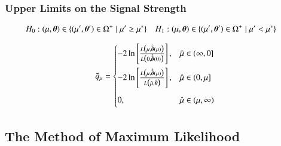 

\subsubsection{Upper Limits on the Signal Strength}


\begin{align*}
  &H_0: (\mu, \myvec{\theta}) \in \{ (\mu^\prime, \myvec{\theta}^\prime) \in \Omega^+ \mid \mu^\prime \geq \mu^* \}
  &&H_1: (\mu, \myvec{\theta}) \in \{ (\mu^\prime, \myvec{\theta}^\prime) \in \Omega^+ \mid \mu^\prime < \mu^* \}
\end{align*}





\begin{align*}
  \tilde{q}_\mu =
  \begin{cases}
    -2\ln\left[ \frac{ L\bigl( \mu, \hat{\hat{\myvec{\theta}}}(\mu) \bigr)}{L\bigl( 0, \hat{\hat{\myvec{\theta}}}(0) \bigr)} \right], & \muhat \in (\infty, 0] \\[1em]
    -2\ln\left[ \frac{ L\bigl( \mu, \hat{\hat{\myvec{\theta}}}(\mu) \bigr)}{L\bigl( \muhat, \hat{\myvec{\theta}} \bigr)} \right], & \muhat \in (0, \mu] \\[1em]
    0,\phantom{ \biggl[  \biggr]} & \muhat \in (\mu, \infty) \\
  \end{cases}
\end{align*}



\subsection{The Method of Maximum Likelihood}

